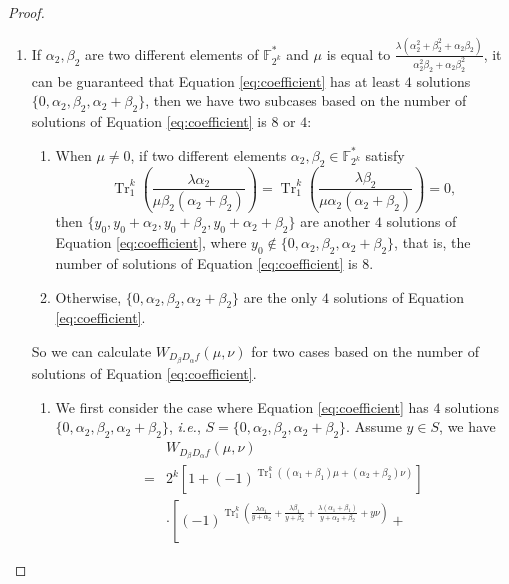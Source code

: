\documentclass{article}
\newcommand{\F}{\mathbb{F}}
\newcommand{\0}{\textbf{0}}
\newcommand{\1}{\textbf{1}}
\newcommand{\TRACE}{\operatorname{Tr}_1^k}
\theoremstyle{plain}
\begin{document}
\begin{proof}
\begin{enumerate}[label=\textbf{Case \arabic*},wide = 0pt]
            \item If $\alpha_2,\beta_2$ are two different elements of $\F_{2^k}^*$ and $\mu$ is equal to $\frac{\lambda(\alpha_2^2+\beta_2^2+\alpha_2\beta_2)}{\alpha_2^2\beta_2+\alpha_2\beta_2^2}$,
            it can be guaranteed that Equation \eqref{eq:coefficient} has at least $4$ solutions $\{0,\alpha_2,\beta_2,\alpha_2+\beta_2\}$, then we have two subcases based on the number of solutions of Equation \eqref{eq:coefficient} is $8$ or $4$:
            \begin{enumerate}[label=(\arabic{*})]
                \item When $\mu\ne 0$, if two different elements $\alpha_2,\beta_2\in\F_{2^k}^*$ satisfy
                \begin{equation}\label{eq:last_four_solution_condition}
                    \TRACE\left(\frac{\lambda\alpha_2}{\mu\beta_2(\alpha_2+\beta_2)}\right)=\TRACE\left(\frac{\lambda\beta_2}{\mu\alpha_2(\alpha_2+\beta_2)}\right)=0,
                \end{equation}
                then $\{y_0,y_0+\alpha_2,y_0+\beta_2,y_0+\alpha_2+\beta_2\}$ are another $4$ solutions of Equation \eqref{eq:coefficient}, where $y_0\notin\{0,\alpha_2,\beta_2,\alpha_2+\beta_2\}$, that is, the number of solutions of Equation \eqref{eq:coefficient} is $8$.
                \item Otherwise, $\{0,\alpha_2,\beta_2,\alpha_2+\beta_2\}$ are the only $4$ solutions of Equation \eqref{eq:coefficient}.
            \end{enumerate}
            So we can calculate $W_{D_{\beta}D_{\alpha}f}(\mu,\nu)$ for two cases based on the number of solutions of Equation \eqref{eq:coefficient}.
            \begin{enumerate}[label=\textbf{Subcase \Alph{*}},itemindent=*,wide=\parindent]
                \item We first consider the case where Equation \eqref{eq:coefficient} has $4$ solutions
                $\{0,\alpha_2,\beta_2,\alpha_2+\beta_2\}$, \emph{i.e.}, $S=\{0,\alpha_2,\beta_2,\alpha_2+\beta_2\}$.
                Assume $y\in S$, we have
                \begin{align}\label{eq:simpleforms_4}
                    &W_{D_{\beta}D_{\alpha}f}(\mu,\nu)\nonumber\\
                    =&2^k\left[1+(-1)^{\TRACE\left((\alpha_1+\beta_1)\mu+ (\alpha_2+\beta_2)\nu\right)}\right]\nonumber\\
                    &\cdot
                    \left[(-1)^{\TRACE\left(\frac{\lambda\alpha_1}{y+\alpha_2}+\frac{\lambda\beta_1}{y+\beta_2}+\frac{\lambda(\alpha_1+\beta_1)}{y+\alpha_2+\beta_2}+ y\nu\right)}+

\end{align}
\end{enumerate}
\end{enumerate}
\end{proof}
\end{document}
